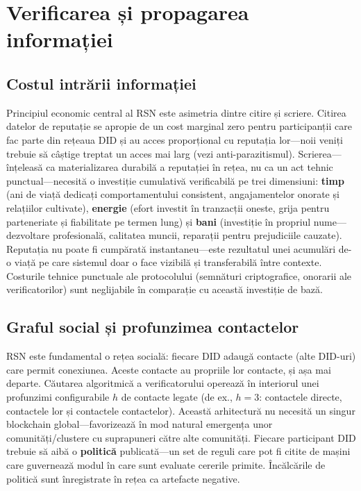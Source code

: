 \documentclass[11pt,a4paper,twocolumn]{article}
\begin{document}
\section{Verificarea și propagarea informației}

\subsection{Costul intrării informației}

Principiul economic central al RSN este asimetria dintre citire și scriere. Citirea datelor de reputație se apropie de un cost marginal zero pentru participanții care fac parte din rețeaua DID și au acces proporțional cu reputația lor---noii veniți trebuie să câștige treptat un acces mai larg (vezi anti-parazitismul). Scrierea---înțeleasă ca materializarea durabilă a reputației în rețea, nu ca un act tehnic punctual---necesită o investiție cumulativă verificabilă pe trei dimensiuni: \textbf{timp} (ani de viață dedicați comportamentului consistent, angajamentelor onorate și relațiilor cultivate), \textbf{energie} (efort investit în tranzacții oneste, grija pentru parteneriate și fiabilitate pe termen lung) și \textbf{bani} (investiție în propriul nume---dezvoltare profesională, calitatea muncii, reparații pentru prejudiciile cauzate). Reputația nu poate fi cumpărată instantaneu---este rezultatul unei acumulări de-o viață pe care sistemul doar o face vizibilă și transferabilă între contexte. Costurile tehnice punctuale ale protocolului (semnături criptografice, onorarii ale verificatorilor) sunt neglijabile în comparație cu această investiție de bază.

\subsection{Graful social și profunzimea contactelor}

RSN este fundamental o rețea socială: fiecare DID adaugă contacte (alte DID-uri) care permit conexiunea. Aceste contacte au propriile lor contacte, și așa mai departe. Căutarea algoritmică a verificatorului operează în interiorul unei profunzimi configurabile $h$ de contacte legate (de ex., $h=3$: contactele directe, contactele lor și contactele contactelor). Această arhitectură nu necesită un singur blockchain global---favorizează în mod natural emergența unor comunități/clustere cu suprapuneri către alte comunități. Fiecare participant DID trebuie să aibă o \textbf{politică} publicată---un set de reguli care pot fi citite de mașini care guvernează modul în care sunt evaluate cererile primite. Încălcările de politică sunt înregistrate în rețea ca artefacte negative.
\end{document}

